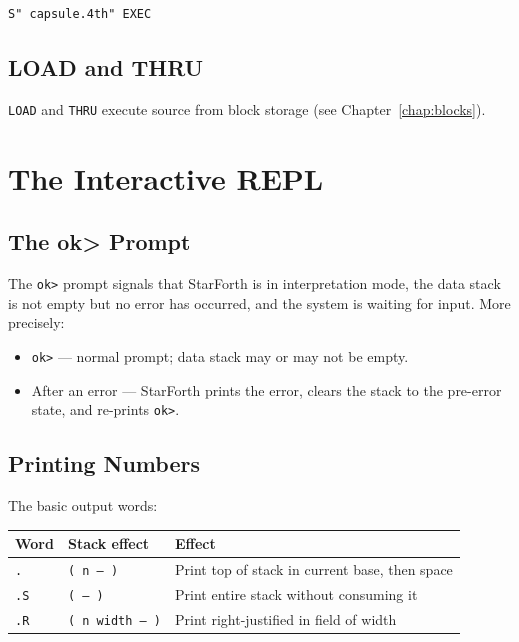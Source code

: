 \begin{lstlisting}[language=Forth]
S" capsule.4th" EXEC
\end{lstlisting}

\section{LOAD and THRU}
\label{sec:load-thru}

\texttt{LOAD} and \texttt{THRU} execute source from block storage (see
Chapter~\ref{chap:blocks}).

\chapter{The Interactive REPL}
\label{chap:repl}

\section{The ok> Prompt}
\label{sec:ok-prompt}

The \texttt{ok>} prompt signals that StarForth is in interpretation mode,
the data stack is not empty but no error has occurred, and the system is
waiting for input. More precisely:

\begin{itemize}
  \item \texttt{ok>} — normal prompt; data stack may or may not be empty.
  \item After an error — StarForth prints the error, clears the stack to the
    pre-error state, and re-prints \texttt{ok>}.
\end{itemize}

\section{Printing Numbers}
\label{sec:printing}

The basic output words:

\begin{center}
\begin{tabular}{lll}
\toprule
Word & Stack effect & Effect \\
\midrule
\texttt{.}  & \texttt{( n -- )} & Print top of stack in current base, then space \\
\texttt{.S} & \texttt{( -- )} & Print entire stack without consuming it \\
\texttt{.R} & \texttt{( n width -- )} & Print right-justified in field of width \\
\bottomrule
\end{tabular}
\end{center}

